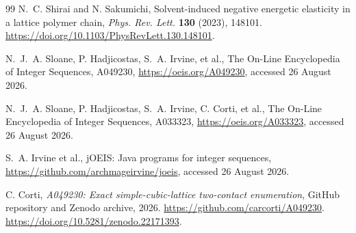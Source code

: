 \documentclass[11pt]{article}
\theoremstyle{definition}
\theoremstyle{remark}
\begin{document}
\begin{thebibliography}{99}
N.~C. Shirai and N. Sakumichi,
\newblock Solvent-induced negative energetic elasticity in a lattice polymer
chain,
\newblock \emph{Phys. Rev. Lett.} \textbf{130} (2023), 148101.
\url{https://doi.org/10.1103/PhysRevLett.130.148101}.

N.~J.~A. Sloane, P. Hadjicostas, S.~A. Irvine, et al.,
\newblock The On-Line Encyclopedia of Integer Sequences, A049230,
\newblock \url{https://oeis.org/A049230}, accessed 26 August 2026.

N.~J.~A. Sloane, P. Hadjicostas, S.~A. Irvine, C. Corti, et al.,
\newblock The On-Line Encyclopedia of Integer Sequences, A033323,
\newblock \url{https://oeis.org/A033323}, accessed 26 August 2026.

S.~A. Irvine et al.,
\newblock jOEIS: Java programs for integer sequences,
\newblock \url{https://github.com/archmageirvine/joeis}, accessed 26 August
2026.

C. Corti,
\newblock \emph{A049230: Exact simple-cubic-lattice two-contact enumeration},
\newblock GitHub repository and Zenodo archive, 2026.
\url{https://github.com/carcorti/A049230}.
\url{https://doi.org/10.5281/zenodo.22171393}.

\end{thebibliography}
\end{document}
